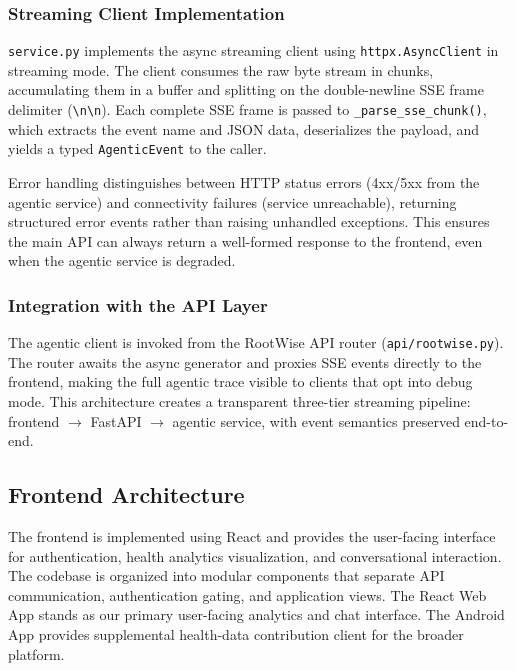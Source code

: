 \documentclass[11pt,twocolumn]{article}
\begin{document}
\subsubsection{Streaming Client Implementation}

\texttt{service.py} implements the async streaming client using \texttt{httpx.AsyncClient} in streaming mode. The client consumes the raw byte stream in chunks, accumulating them in a buffer and splitting on the double-newline SSE frame delimiter (\texttt{\textbackslash n\textbackslash n}). Each complete SSE frame is passed to \texttt{\_parse\_sse\_chunk()}, which extracts the event name and JSON data, deserializes the payload, and yields a typed \texttt{AgenticEvent} to the caller.

Error handling distinguishes between HTTP status errors (4xx/5xx from the agentic service) and connectivity failures (service unreachable), returning structured error events rather than raising unhandled exceptions. This ensures the main API can always return a well-formed response to the frontend, even when the agentic service is degraded.

\subsubsection{Integration with the API Layer}

The agentic client is invoked from the RootWise API router (\texttt{api/rootwise.py}). The router awaits the async generator and proxies SSE events directly to the frontend, making the full agentic trace visible to clients that opt into debug mode. This architecture creates a transparent three-tier streaming pipeline: frontend $\to$ FastAPI $\to$ agentic service, with event semantics preserved end-to-end.

\subsection{Frontend Architecture}

The frontend is implemented using React and provides the user-facing interface for authentication, health analytics visualization, and conversational interaction. The codebase is organized into modular components that separate API communication, authentication gating, and application views. The React Web App stands as our primary user-facing analytics and chat interface. The Android App provides supplemental health-data contribution client for the broader platform.
\end{document}

